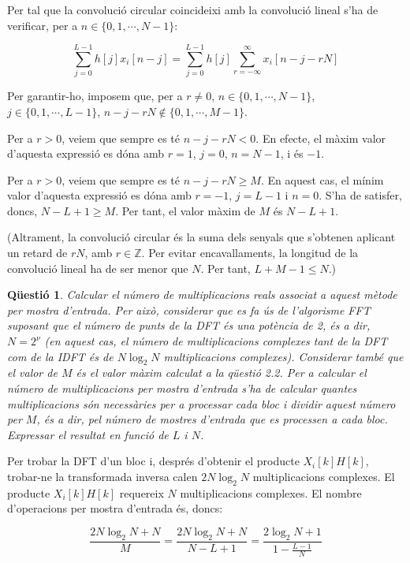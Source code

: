 \documentclass[11pt,a4]{article}
\numberwithin{equation}{section}
\theoremstyle{thmstyle}
\theoremstyle{thmstyle}
\theoremstyle{thmstyle}
\theoremstyle{thmstyle}
\theoremstyle{thmstyle}
\theoremstyle{thmstyle}
\newtheorem{question}{Qüestió}
\begin{document}
Per tal que la convolució circular coincideixi amb la convolució lineal s'ha de verificar, per a $n\in\lbrace 0, 1, \cdots, N-1 \rbrace$:

$$
\sum_{j=0}^{L-1} h[j]x_i[n-j] = \sum_{j=0}^{L-1} h[j]\sum_{r=-\infty}^{\infty}x_i[n-j-rN]
$$

Per garantir-ho, imposem que, per a $r\neq 0$, $n\in\lbrace 0, 1, \cdots, N-1 \rbrace$, $j\in\lbrace 0, 1, \cdots, L-1 \rbrace$, $n-j-rN\not\in \lbrace 0, 1, \cdots, M-1 \rbrace$.

Per a $r>0$, veiem que sempre es té $n-j-rN<0$. En efecte, el màxim valor d'aquesta expressió es dóna amb $r = 1$, $j=0$, $n=N-1$, i és $-1$.

Per a $r>0$, veiem que sempre es té $n-j-rN\geqslant M$. En aquest cas, el mínim valor d'aquesta expressió es dóna amb $r = -1$, $j=L-1$ i $n=0$. S'ha de satisfer, doncs, $N-L+1\geqslant M$. Per tant, el valor màxim de $M$ és $N-L+1$.

(Altrament, la convolució circular és la suma dels senyals que s'obtenen aplicant un retard de $rN$, amb $r\in\mathbb{Z}$. Per evitar encavallaments, la longitud de la convolució lineal ha de ser menor que $N$. Per tant, $L+M-1\leqslant N$.)

\begin{question}
Calcular el número de multiplicacions reals associat a aquest mètode per mostra d’entrada. Per això, considerar que es fa ús de l’algorisme FFT suposant que el número de punts de la DFT és una potència de 2, és a dir, $N=2^\nu$ (en aquest cas, el número de multiplicacions complexes tant de la DFT com de la IDFT és de $N\log_2 N$ multiplicacions complexes). Considerar també que el valor de $M$ és el valor màxim calculat
a la qüestió 2.2. Per a calcular el número de multiplicacions per mostra d’entrada s’ha de calcular quantes multiplicacions són necessàries per a processar cada bloc i dividir aquest número per $M$, és a dir, pel número de mostres d’entrada que es processen a cada bloc. Expressar el resultat en funció de $L$ i $N$.
\end{question}

Per trobar la DFT d'un bloc i, després d'obtenir el producte $X_i[k]H[k]$, trobar-ne la transformada inversa calen $2N\log_2 N$ multiplicacions complexes. El producte $X_i[k]H[k]$ requereix $N$ multiplicacions complexes. El nombre d'operacions per mostra d'entrada és, doncs:

$$
\frac{2N\log_2 N + N}{M} = \frac{2N\log_2 N + N}{N-L+1} = \frac{2\log_2 N + 1}{1-\frac{L-1}{N}}
$$
\end{document}
